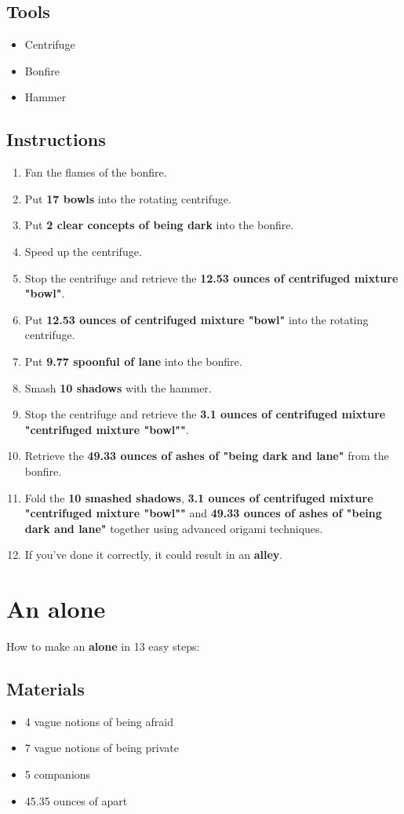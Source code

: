 \documentclass{article}
\begin{document}
\subsection{Tools}\begin{itemize}
\item 
Centrifuge
\item 
Bonfire
\item 
Hammer
\end{itemize}
\subsection{Instructions}\begin{enumerate}
\item 
Fan the flames of the bonfire.
\item 
Put \textbf{17 bowls} into the rotating centrifuge.
\item 
Put \textbf{2 clear concepts of being dark} into the bonfire.
\item 
Speed up the centrifuge.
\item 
Stop the centrifuge and retrieve the \textbf{12.53 ounces of centrifuged mixture "bowl"}.
\item 
Put \textbf{12.53 ounces of centrifuged mixture "bowl"} into the rotating centrifuge.
\item 
Put \textbf{9.77 spoonful of lane} into the bonfire.
\item 
Smash \textbf{10 shadows} with the hammer.
\item 
Stop the centrifuge and retrieve the \textbf{3.1 ounces of centrifuged mixture "centrifuged mixture "bowl""}.
\item 
Retrieve the \textbf{49.33 ounces of ashes of "being dark and lane"} from the bonfire.
\item 
Fold the \textbf{10 smashed shadows}, \textbf{3.1 ounces of centrifuged mixture "centrifuged mixture "bowl""} and \textbf{49.33 ounces of ashes of "being dark and lane"} together using advanced origami techniques.
\item 
If you've done it correctly, it could result in an \textbf{alley}.
\end{enumerate}
\newpage
\section{An alone}How to make an \textbf{alone} in 13 easy steps:

\subsection{Materials}\begin{itemize}
\item 
4 vague notions of being afraid
\item 
7 vague notions of being private
\item 
5 companions
\item 
45.35 ounces of apart
\end{itemize}
\end{document}
